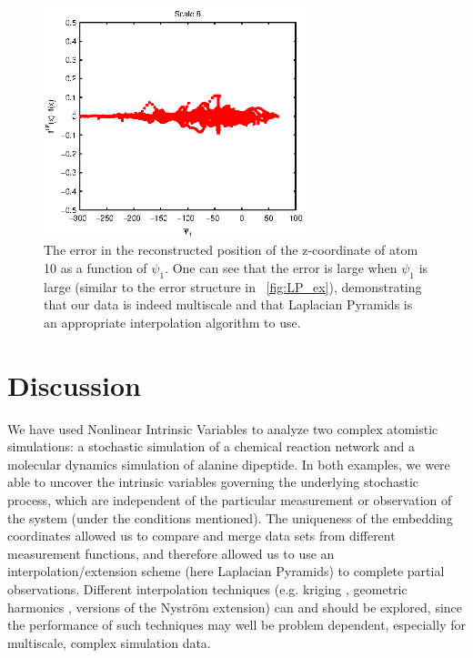 \begin{figure}[t]
    \centering
    \includegraphics[width=3in]{fig10b}
    \caption[Error in selected coordinate of reconstructed alanine dipeptide configurations]{The error in the reconstructed position of the z-coordinate of atom 10 as a function of $\psi_1$. One can see that the error is large when $\psi_1$ is large (similar to the error structure in \fig~\ref{fig:LP_ex}), demonstrating that our data is indeed multiscale and that Laplacian Pyramids is an appropriate interpolation algorithm to use.}
    \label{fig:LapPyr_ala2_errors}
\end{figure}

\section{Discussion} \label{sec:conclusions}
%
We have used Nonlinear Intrinsic Variables to analyze two complex atomistic simulations: a stochastic simulation of a chemical reaction network and a molecular dynamics simulation of alanine dipeptide.
%
In both examples, we were able to uncover the intrinsic variables governing the underlying stochastic process, which are independent
of the particular measurement or observation  of the system (under the conditions mentioned).
%
The uniqueness of the embedding coordinates allowed us to compare and merge data sets from different measurement functions,
and therefore allowed us to use an interpolation/extension scheme (here Laplacian Pyramids) to complete partial observations.
%
Different interpolation techniques (e.g. kriging \cite{matheron1963principles, matheron1973intrinsic}, geometric harmonics \cite{coifman2006geometric},  versions of the Nystr\"{o}m extension) can and should
be explored, since the performance of such techniques may well be problem dependent, especially for multiscale, complex simulation data.

